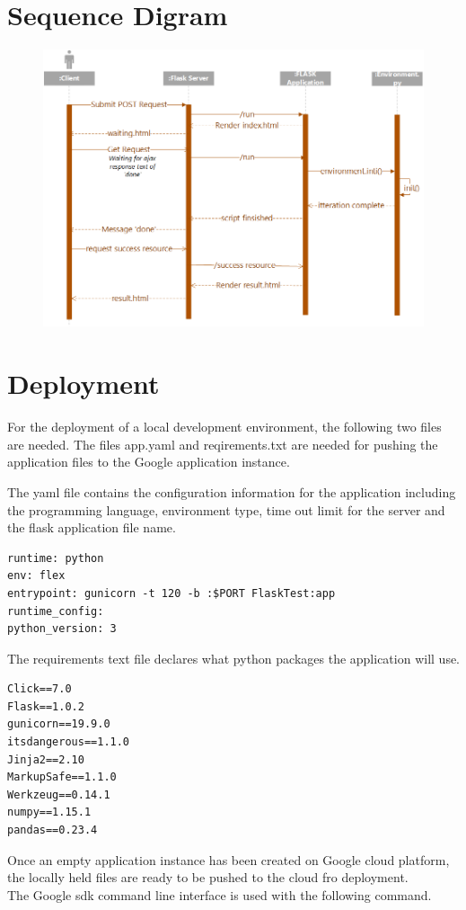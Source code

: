 \section{Sequence Digram}
\begin{figure}[H]
	\centering
	\includegraphics[width=1.2\linewidth]{img/sequence}
	\caption{}
	\label{fig:sequence}
\end{figure}


\section{Deployment}
For the deployment of a local development environment, the following two files are needed.
The files app.yaml and reqirements.txt are needed for pushing the application files to the Google application instance.

The yaml file contains the configuration information for the application including the programming language, environment type, time out limit for the server and the flask application file name.
\begin{verbatim}
runtime: python
env: flex
entrypoint: gunicorn -t 120 -b :$PORT FlaskTest:app
runtime_config:
python_version: 3
\end{verbatim}
The requirements text file declares what python packages the application will use.
\begin{verbatim}
Click==7.0
Flask==1.0.2
gunicorn==19.9.0
itsdangerous==1.1.0
Jinja2==2.10
MarkupSafe==1.1.0
Werkzeug==0.14.1
numpy==1.15.1
pandas==0.23.4
\end{verbatim}
Once an empty application instance has been created on Google cloud platform, the locally held files are ready to be pushed to the cloud fro deployment.\\
The Google sdk command line interface is used with the following command.

